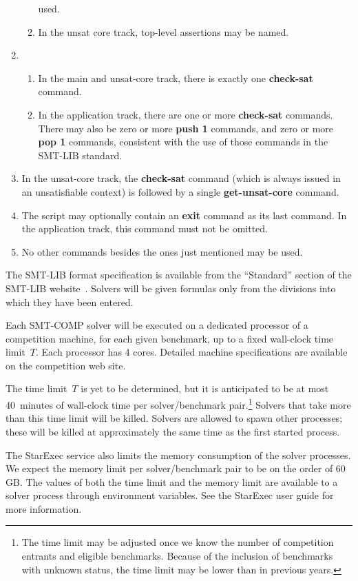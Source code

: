 \documentclass[12pt]{article}
\newcommand{\akey}[1]{\textbf{#1}}
\begin{document}
\begin{enumerate}
\begin{enumerate}
      used.
    \item In the unsat core track, top-level assertions may be named.
  \end{enumerate}
\item
  \begin{enumerate}
  \item In the main and unsat-core track, there is exactly one
    \akey{check-sat} command.
  \item In the application track, there are one or more
    \akey{check-sat} commands.  There may also be zero or more
    \akey{push 1} commands, and zero or more \akey{pop 1} commands,
    consistent with the use of those commands in the SMT-LIB standard.
  \end{enumerate}
\item In the unsat-core track, the \akey{check-sat} command (which is
  always issued in an unsatisfiable context) is followed by a single
  \akey{get-unsat-core} command.
\item The script may optionally contain an \akey{exit} command as its
  last command.  In the application track, this command must not be
  omitted.
\item No other commands besides the ones just mentioned may be used.
\end{enumerate}
%
The SMT-LIB format specification is available from the ``Standard''
section of the SMT-LIB website~\cite{SMT-LIB}.  Solvers will be given
formulas only from the divisions into which they have been entered.

%
Each SMT-COMP solver will be executed on a dedicated processor of a
competition machine, for each given benchmark, up to a fixed
wall-clock time limit~$T$.  Each processor has 4 cores.  Detailed
machine specifications are available on the competition web site.

The time limit~$T$ is yet to be determined, but it is anticipated to
be at most 40~minutes of wall-clock time per solver/benchmark
pair.\footnote{The time limit may be adjusted once we know the number
  of competition entrants and eligible benchmarks.  Because of the
  inclusion of benchmarks with unknown status, the time limit may be
  lower than in previous years.}  Solvers that take more than this
time limit will be killed.  Solvers are allowed to spawn other
processes; these will be killed at approximately the same time as the
first started process.

The StarExec service also limits the memory consumption of the solver
processes.  We expect the memory limit per solver/benchmark pair to be
on the order of 60\,GB.  The values of both the time limit and the
memory limit are available to a solver process through environment
variables.  See the StarExec user guide for more information.
\end{document}
